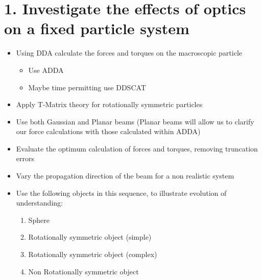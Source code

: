 \documentclass[11pt]{meetingmins}
\begin{document}
\maketitle

\section{1. Investigate the effects of optics on a fixed particle system}

\begin{itemize}

\item Using DDA calculate the forces and torques on the macroscopic particle

\begin{itemize}

\item Use ADDA

\item Maybe time permitting use DDSCAT

\end{itemize}

\item Apply T-Matrix theory for rotationally symmetric particles

\item Use both Gaussian and Planar beams (Planar beams will allow us to clarify our force calculations with those calculated within ADDA)

\item Evaluate the optimum calculation of forces and torques, removing truncation errors

\item Vary the propagation direction of the beam for a non realistic system

\item Use the following objects in this sequence, to illustrate evolution of understanding:

\begin{enumerate}

\item Sphere

\item Rotationally symmetric object (simple)

\item Rotationally symmetric object (complex)

\item Non Rotationally symmetric object

\end{enumerate}

\end{itemize}
\end{document}
